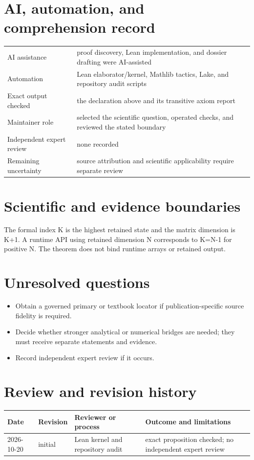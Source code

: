 \documentclass[11pt]{article}
\begin{document}
\section{AI, automation, and comprehension record}
\begin{tabularx}{\textwidth}{@{}lY@{}}\toprule
AI assistance & proof discovery, Lean implementation, and dossier drafting were AI-assisted \\
Automation & Lean elaborator/kernel, Mathlib tactics, Lake, and repository audit scripts \\
Exact output checked & the declaration above and its transitive axiom report \\
Maintainer role & selected the scientific question, operated checks, and reviewed the stated boundary \\
Independent expert review & none recorded \\
Remaining uncertainty & source attribution and scientific applicability require separate review \\
\bottomrule\end{tabularx}

\section{Scientific and evidence boundaries}
The formal index K is the highest retained state and the matrix dimension is K+1. A runtime API using retained dimension N corresponds to K=N-1 for positive N. The theorem does not bind runtime arrays or retained output.

\section{Unresolved questions}
\begin{itemize}
\item Obtain a governed primary or textbook locator if publication-specific source fidelity is required.
\item Decide whether stronger analytical or numerical bridges are needed; they must receive separate statements and evidence.
\item Record independent expert review if it occurs.
\end{itemize}

\section{Review and revision history}
\begin{tabularx}{\textwidth}{@{}lllX@{}}\toprule
Date & Revision & Reviewer or process & Outcome and limitations \\
\midrule
2026-10-20 & initial & Lean kernel and repository audit & exact proposition checked; no independent expert review \\
\bottomrule\end{tabularx}
\end{document}
